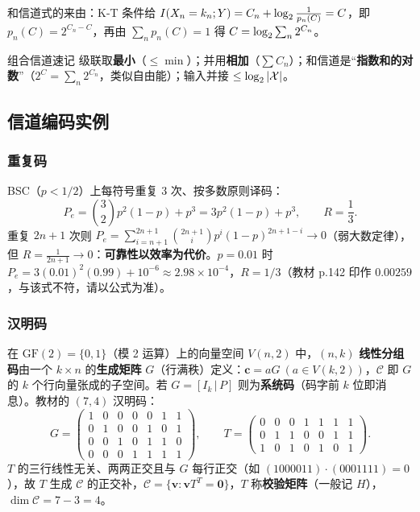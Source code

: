 和信道式的来由：K-T 条件给 $I\!\left(X_n=k_n;Y\right)=C_n+\log_{2}\frac{1}{p_n(C)}=C$，即 $p_n(C)=2^{C_n-C}$，再由 $\sum_np_n(C)=1$ 得 $C=\log_{2}\sum_n2^{C_n}$。

\begin{keypoint}{组合信道速记}
级联取\textbf{最小}（$\le\min$）；并用\textbf{相加}（$\sum C_n$）；和信道是“\textbf{指数和的对数}”（$2^C=\sum_n2^{C_n}$，类似自由能）；输入并接 $\le\log_{2}|\mathcal{X}|$。
\end{keypoint}

\subsection{信道编码实例}

\subsubsection{重复码}

BSC（$p<1/2$）上每符号重复 3 次、按多数原则译码：
\begin{equation*}
P_e=\binom32p^2(1-p)+p^3=3p^2(1-p)+p^3,\qquad R=\frac13 .
\end{equation*}
重复 $2n+1$ 次则 $P_e=\sum_{i=n+1}^{2n+1}\binom{2n+1}{i}p^i(1-p)^{2n+1-i}\to0$（弱大数定律），但 $R=\frac{1}{2n+1}\to0$：\textbf{可靠性以效率为代价}。$p=0.01$ 时 $P_e=3(0.01)^2(0.99)+10^{-6}\approx2.98\times10^{-4}$，$R=1/3$（教材 p.142 印作 $0.00259$，与该式不符，请以公式为准）。

\subsubsection{汉明码}

在 $\mathrm{GF}(2)=\{0,1\}$（模 2 运算）上的向量空间 $V(n,2)$ 中，$(n,k)$ \textbf{线性分组码}由一个 $k\times n$ 的\textbf{生成矩阵} $G$（行满秩）定义：$\mathbf{c}=aG\ (a\in V(k,2))$，$\mathcal{C}$ 即 $G$ 的 $k$ 个行向量张成的子空间。若 $G=[I_k\,|\,P]$ 则为\textbf{系统码}（码字前 $k$ 位即消息）。教材的 $(7,4)$ 汉明码：
\begin{equation*}
G=\begin{pmatrix}1&0&0&0&0&1&1\\0&1&0&0&1&0&1\\0&0&1&0&1&1&0\\0&0&0&1&1&1&1\end{pmatrix},
\qquad
T=\begin{pmatrix}0&0&0&1&1&1&1\\0&1&1&0&0&1&1\\1&0&1&0&1&0&1\end{pmatrix}.
\end{equation*}
$T$ 的三行线性无关、两两正交且与 $G$ 每行正交（如 $(1000011)\cdot(0001111)=0$），故 $T$ 生成 $\mathcal{C}$ 的正交补，$\mathcal{C}=\{\mathbf{v}:\mathbf{v}T^{T}=\mathbf{0}\}$，$T$ 称\textbf{校验矩阵}（一般记 $H$），$\dim\mathcal{C}=7-3=4$。

